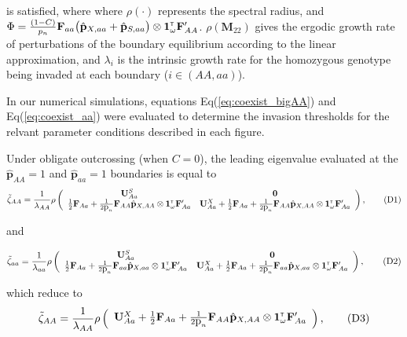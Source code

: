 \documentclass[11pt]{article}
\newcommand\numberthis{\addtocounter{equation}{1}\tag{\theequation}}
\def\mbf#1{\mathbf{#1}}
\newcommand{\tr}{{\mbox{\tiny \sf T}}}
\begin{document}
\noindent is satisfied, where where $\rho(\cdot)$ represents the spectral radius, and $\Phi = \frac{(1 - C)}{p_{n}} \mbf{F}_{aa} \big(\hat{\mbf{p}}_{X,aa}+ \hat{\mbf{p}}_{S,aa}  \big) \otimes \mathbf{1}^\tr_{\omega} \mathbf{F}_{AA}^\prime$. $\rho(\mbf{M}_{22})$ gives the ergodic growth rate of perturbations of the boundary equilibrium according to the linear approximation, and $\lambda_i$ is the intrinsic growth rate for the homozygous genotype being invaded at each boundary ($i \in (AA,aa)$). 

In our numerical simulations, equations Eq(\ref{eq:coexist_bigAA}) and Eq(\ref{eq:coexist_aa}) were evaluated to determine the invasion thresholds for the relvant parameter conditions described in each figure.

Under obligate outcrossing (when $C=0$), the leading eigenvalue evaluated at the $\hat{\mbf{p}}_{AA} = 1$ and $\hat{\mbf{p}}_{aa} = 1$ boundaries is equal to
\begin{align*} \label{eq:eigAAOut}
	\tilde{\zeta}_{AA} = 
		\frac{1}{\lambda_{AA}}\rho\left(\begin{array}{cc}
\mathbf{U}^S_{Aa}  & \mathbf{0} \\
 \frac{1}{2} \mbf{F}_{Aa}+\frac{1}{2\mbox{p}_{n}}\mbf{F}_{AA} \hat{\mbf{p}}_{X,AA} \otimes \mathbf{1}^\tr_{\omega} \mathbf{F}_{Aa}^\prime &\mathbf{U}^X_{Aa} + \frac{1}{2} \mbf{F}_{Aa} +\frac{1}{2\mbox{p}_{n}} \mbf{F}_{AA} \hat{\mbf{p}}_{X,AA} \otimes \mathbf{1}^\tr_{\omega} \mathbf{F}_{Aa}^\prime
			\end{array} \right), \numberthis
\end{align*}

\noindent and

\begin{align*} \label{eq:eigaaOut}
	\tilde{\zeta}_{aa} = 
		\frac{1}{\lambda_{aa}}\rho\left(\begin{array}{cc}
\mathbf{U}^S_{Aa}  & \mathbf{0} \\
 \frac{1}{2} \mbf{F}_{Aa}+\frac{1}{2\mbox{p}_{n}}\mbf{F}_{aa} \hat{\mbf{p}}_{X,aa} \otimes \mathbf{1}^\tr_{\omega} \mathbf{F}_{Aa}^\prime &\mathbf{U}^X_{Aa} + \frac{1}{2} \mbf{F}_{Aa} +\frac{1}{2\mbox{p}_{n}} \mbf{F}_{aa} \hat{\mbf{p}}_{X,aa} \otimes \mathbf{1}^\tr_{\omega} \mathbf{F}_{Aa}^\prime
			\end{array} \right), \numberthis
\end{align*}

\noindent which reduce to 
\begin{align*} \label{eq:eigAATwoSex}
	\tilde{\zeta}_{AA} = 
		\frac{1}{\lambda_{AA}}\rho\left(\begin{array}{c}
\mathbf{U}^X_{Aa} + \frac{1}{2} \mbf{F}_{Aa} +\frac{1}{2\mbox{p}_{n}} \mbf{F}_{AA} \hat{\mbf{p}}_{X,AA} \otimes \mathbf{1}^\tr_{\omega} \mathbf{F}_{Aa}^\prime
			\end{array} \right), \numberthis
\end{align*}
\end{document}
